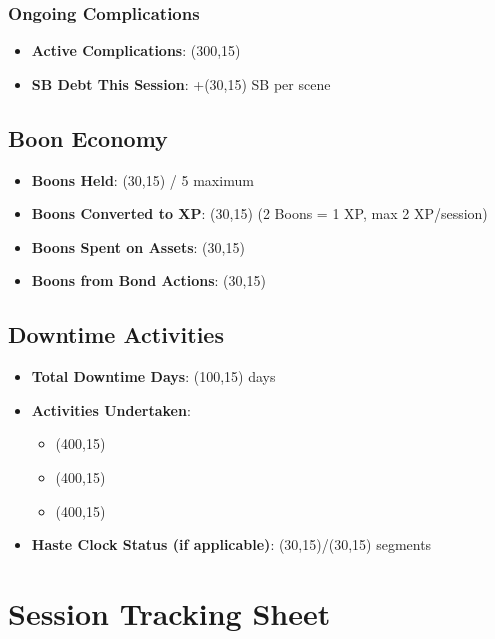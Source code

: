 \documentclass[11pt,letterpaper]{article}
\begin{document}
\subsubsection{Ongoing Complications}
\begin{itemize}
    \item \textbf{Active Complications}: \framebox(300,15){}
    \item \textbf{SB Debt This Session}: +\framebox(30,15){} SB per scene
\end{itemize}

\subsection{Boon Economy}

\begin{itemize}
    \item \textbf{Boons Held}: \framebox(30,15){} / 5 maximum
    \item \textbf{Boons Converted to XP}: \framebox(30,15){} (2 Boons = 1 XP, max 2 XP/session)
    \item \textbf{Boons Spent on Assets}: \framebox(30,15){}
    \item \textbf{Boons from Bond Actions}: \framebox(30,15){}
\end{itemize}

\subsection{Downtime Activities}

\begin{itemize}
    \item \textbf{Total Downtime Days}: \framebox(100,15){} days
    \item \textbf{Activities Undertaken}: 
    \begin{itemize}
        \item \framebox(400,15){}
        \item \framebox(400,15){}
        \item \framebox(400,15){}
    \end{itemize}
    \item \textbf{Haste Clock Status (if applicable)}: \framebox(30,15){}/\framebox(30,15){} segments
\end{itemize}

\newpage

\section{Session Tracking Sheet}
\end{document}
